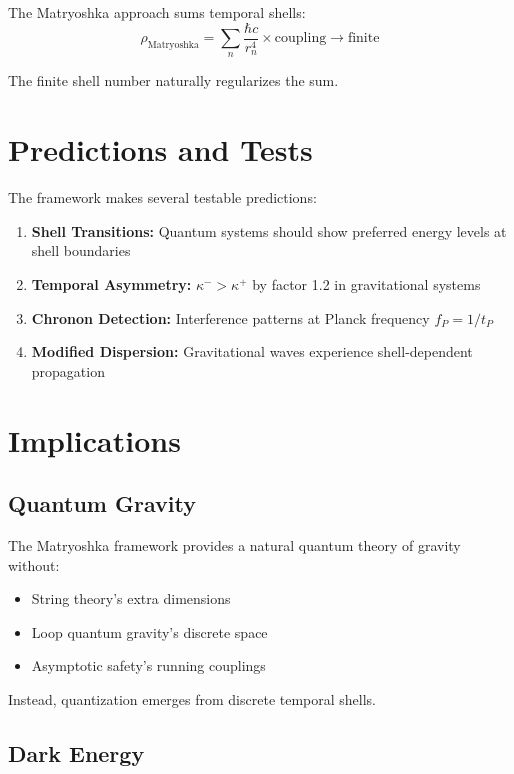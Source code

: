 \documentclass[12pt,a4paper]{article}
\begin{document}
The Matryoshka approach sums temporal shells:
\begin{equation}
\rho_{\text{Matryoshka}} = \sum_n \frac{\hbar c}{r_n^4} \times \text{coupling} \rightarrow \text{finite}
\end{equation}

The finite shell number naturally regularizes the sum.

\section{Predictions and Tests}

The framework makes several testable predictions:

\begin{enumerate}
\item \textbf{Shell Transitions:} Quantum systems should show preferred energy levels at shell boundaries
\item \textbf{Temporal Asymmetry:} $\kappa^- > \kappa^+$ by factor 1.2 in gravitational systems
\item \textbf{Chronon Detection:} Interference patterns at Planck frequency $f_P = 1/t_P$
\item \textbf{Modified Dispersion:} Gravitational waves experience shell-dependent propagation
\end{enumerate}

\section{Implications}

\subsection{Quantum Gravity}

The Matryoshka framework provides a natural quantum theory of gravity without:
\begin{itemize}
\item String theory's extra dimensions
\item Loop quantum gravity's discrete space
\item Asymptotic safety's running couplings
\end{itemize}

Instead, quantization emerges from discrete temporal shells.

\subsection{Dark Energy}
\end{document}
